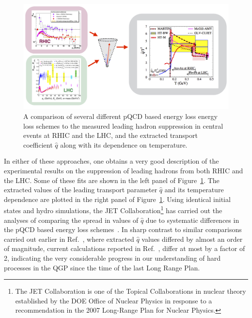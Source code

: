 \begin{figure}[t]
\centerline{
\includegraphics[width=1.03\textwidth]{fig/JetProgressFig1_v2}}
\caption[RHIC and LHC data compared to different pQCD energy loss energy loss schemes]{A comparison of several different pQCD based energy loss energy loss schemes to the measured leading hadron suppression in central events at RHIC and the LHC, and the extracted transport coefficient $\hat{q}$ along with its dependence on temperature.}
\label{fig:JetProgressFig1}
\end{figure}


In either of these approaches, one obtains a very good description of the experimental results on the suppression of leading hadrons from both RHIC and the LHC. Some of these fits are shown in the left panel of Figure~\ref{fig:JetProgressFig1}.
The extracted values of the leading transport parameter $\hat{q}$ and its temperature dependence are plotted in the right panel of Figure~\ref{fig:JetProgressFig1}. Using identical 
initial states and hydro simulations, 
the JET Collaboration\footnote{The JET Collaboration is one of the Topical Collaborations in nuclear theory established by the DOE Office of Nuclear Physics in response to a recommendation in the 2007 Long-Range Plan for Nuclear Physics.}\cite{JET}
has carried out the analyses of comparing the spread in values of $\hat{q}$ due to systematic differences in the pQCD based 
energy loss schemes~\cite{Burke:2013yra}. In sharp contrast to similar comparisons carried out earlier in Ref.~\cite{Bass:2008rv}, where extracted  $\hat{q}$ values differed by almost an order of magnitude, current calculations reported in Ref.~\cite{Burke:2013yra}, differ at most by a factor of 2, 
indicating the very considerable progress in our understanding of hard processes in the QGP since the time of the last Long Range Plan.

